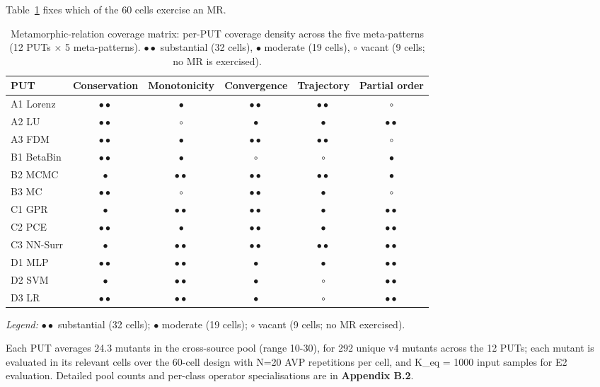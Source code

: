 \documentclass[manuscript,screen,review]{acmart}
\begin{document}
Table~\ref{tab:p2-cells} fixes which of the 60 cells exercise an MR.
{%
\small
\begin{longtable}[]{@{}lccccc@{}}
\caption{Metamorphic-relation coverage matrix: per-PUT coverage density across the five meta-patterns (12 PUTs $\times$ 5 meta-patterns). $\bullet\bullet$ substantial (32 cells), $\bullet$ moderate (19 cells), $\circ$ vacant (9 cells; no MR is exercised).}\label{tab:p2-cells}\\
\toprule\noalign{}
PUT & Conservation & Monotonicity & Convergence & Trajectory & Partial order \\
\midrule\noalign{}
\endfirsthead
\endhead
\bottomrule\noalign{}
\endlastfoot
A1 Lorenz  & $\bullet\bullet$ & $\bullet$ & $\bullet\bullet$ & $\bullet\bullet$ & $\circ$ \\
A2 LU      & $\bullet\bullet$ & $\circ$ & $\bullet$ & $\bullet$ & $\bullet\bullet$ \\
A3 FDM     & $\bullet\bullet$ & $\bullet$ & $\bullet\bullet$ & $\bullet\bullet$ & $\circ$ \\
B1 BetaBin & $\bullet\bullet$ & $\bullet$ & $\circ$ & $\circ$ & $\bullet$ \\
B2 MCMC    & $\bullet$ & $\bullet\bullet$ & $\bullet\bullet$ & $\bullet\bullet$ & $\bullet$ \\
B3 MC      & $\bullet\bullet$ & $\circ$ & $\bullet\bullet$ & $\bullet$ & $\circ$ \\
C1 GPR     & $\bullet$ & $\bullet\bullet$ & $\bullet\bullet$ & $\bullet$ & $\bullet\bullet$ \\
C2 PCE     & $\bullet\bullet$ & $\bullet$ & $\bullet\bullet$ & $\bullet$ & $\bullet\bullet$ \\
C3 NN-Surr & $\bullet$ & $\bullet\bullet$ & $\bullet\bullet$ & $\bullet\bullet$ & $\bullet\bullet$ \\
D1 MLP     & $\bullet\bullet$ & $\bullet\bullet$ & $\bullet$ & $\bullet$ & $\bullet\bullet$ \\
D2 SVM     & $\bullet$ & $\bullet\bullet$ & $\bullet$ & $\circ$ & $\bullet\bullet$ \\
D3 LR      & $\bullet\bullet$ & $\bullet\bullet$ & $\bullet$ & $\circ$ & $\bullet\bullet$ \\
\end{longtable}
}

\noindent\emph{Legend:} $\bullet\bullet$ substantial (32 cells); $\bullet$ moderate (19 cells); $\circ$ vacant (9 cells; no MR exercised).

Each PUT averages 24.3 mutants in the cross-source pool (range
10-30), for 292 unique v4 mutants across the 12 PUTs; each mutant is
evaluated in its relevant cells over the 60-cell design with N=20 AVP
repetitions per cell, and K\_eq = 1000 input samples for E2 evaluation. Detailed
pool counts and per-class operator specialisations are in
\textbf{Appendix B.2}.
\end{document}
